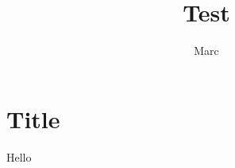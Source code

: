 \documentclass{article}
\begin{document}
\author{Marc}
\title{Test}
\maketitle

\section{Title}
\label{sec:title}
Hello
\end{document}
